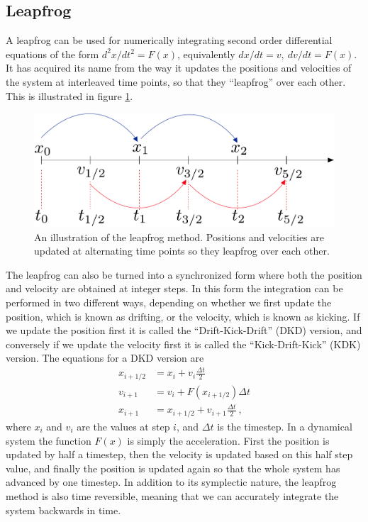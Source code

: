 \documentclass[english, oneside]{HYgradu}
\begin{document}
\subsection{Leapfrog}
A leapfrog can be used for numerically integrating second order differential equations of the form $d^2x/dt^2 = F(x)$, equivalently $dx/dt = v , \ dv/dt = F(x)$. It has acquired its name from the way it updates the positions and velocities of the system at interleaved time points, so that they ``leapfrog'' over each other. This is illustrated in figure \ref{fig:leapfrog}.
\begin{figure}[h!tb]
\centering
\includegraphics[width=\textwidth]{../images/leapfrog.pdf}
\caption{An illustration of the leapfrog method. Positions and velocities are updated at alternating time points so they leapfrog over each other. }
\label{fig:leapfrog}
\end{figure}
The leapfrog can also be turned into a synchronized form where both the position and velocity are obtained at integer steps. In this form the integration can be performed in two different ways, depending on whether we first update the position, which is known as drifting, or the velocity, which is known as kicking. If we update the position first it is called the ``Drift-Kick-Drift'' (DKD) version, and conversely if we update the velocity first it is called the ``Kick-Drift-Kick'' (KDK) version. The equations for a DKD version are
\begin{equation}
\begin{aligned}
x_{i+1/2} &= x_{i}+v_{i} \frac{\Delta t}{2} \\
v_{i+1} &= v_{i}+F(x_{i+1/2})\Delta t \\
x_{i+1} &= x_{i+1/2}+v_{i+1}{\frac {\Delta t}{2}} \ ,
\end{aligned}
\end{equation}
where $x_i$ and $v_i$ are the values at step $i$, and $\Delta t$ is the timestep. In a dynamical system the function $F(x)$ is simply the acceleration. First the position is updated by half a timestep, then the velocity is updated based on this half step value, and finally the position is updated again so that the whole system has advanced by one timestep. In addition to its symplectic nature, the leapfrog method is also time reversible, meaning that we can accurately integrate the system backwards in time.
\end{document}
